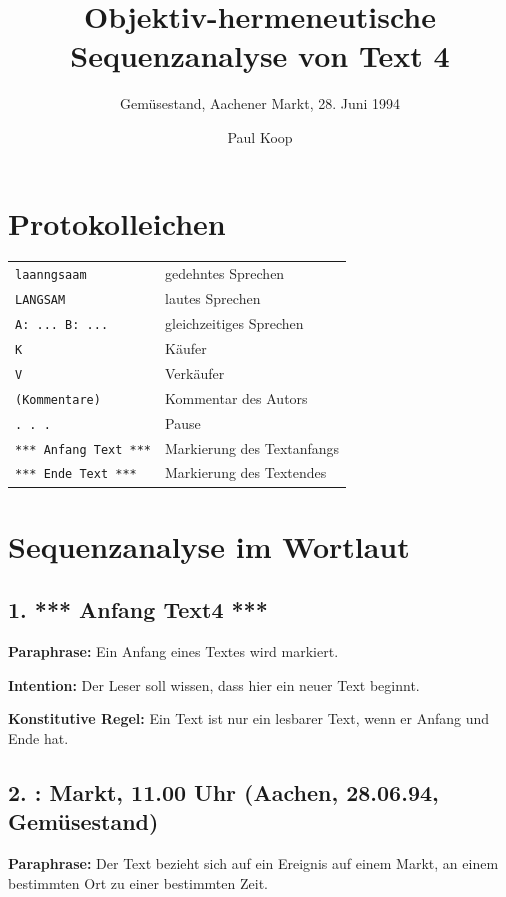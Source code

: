 \documentclass[11pt]{article}
\title{Objektiv-hermeneutische Sequenzanalyse von Text 4}
\subtitle{Gemüsestand, Aachener Markt, 28. Juni 1994}
\author{Paul Koop}
\date{}
\begin{document}
\maketitle

\section*{Protokolleichen}

\begin{tabular}{ll}
\texttt{laanngsaam} & gedehntes Sprechen\\
\texttt{LANGSAM} & lautes Sprechen\\
\texttt{A: ... B: ...} & gleichzeitiges Sprechen\\
\texttt{K} & Käufer\\
\texttt{V} & Verkäufer\\
\texttt{(Kommentare)} & Kommentar des Autors\\
\texttt{. . .} & Pause\\
\texttt{*** Anfang Text ***} & Markierung des Textanfangs\\
\texttt{*** Ende Text ***} & Markierung des Textendes\\
\end{tabular}

\newpage

\section{Sequenzanalyse im Wortlaut}

\subsection*{1. *** Anfang Text4 ***}

\textbf{Paraphrase:} Ein Anfang eines Textes wird markiert.

\textbf{Intention:} Der Leser soll wissen, dass hier ein neuer Text beginnt.

\textbf{Konstitutive Regel:} Ein Text ist nur ein lesbarer Text, wenn er Anfang und Ende hat.

\subsection*{2. : Markt, 11.00 Uhr (Aachen, 28.06.94, Gemüsestand)}

\textbf{Paraphrase:} Der Text bezieht sich auf ein Ereignis auf einem Markt, an einem bestimmten Ort zu einer bestimmten Zeit.
\end{document}
